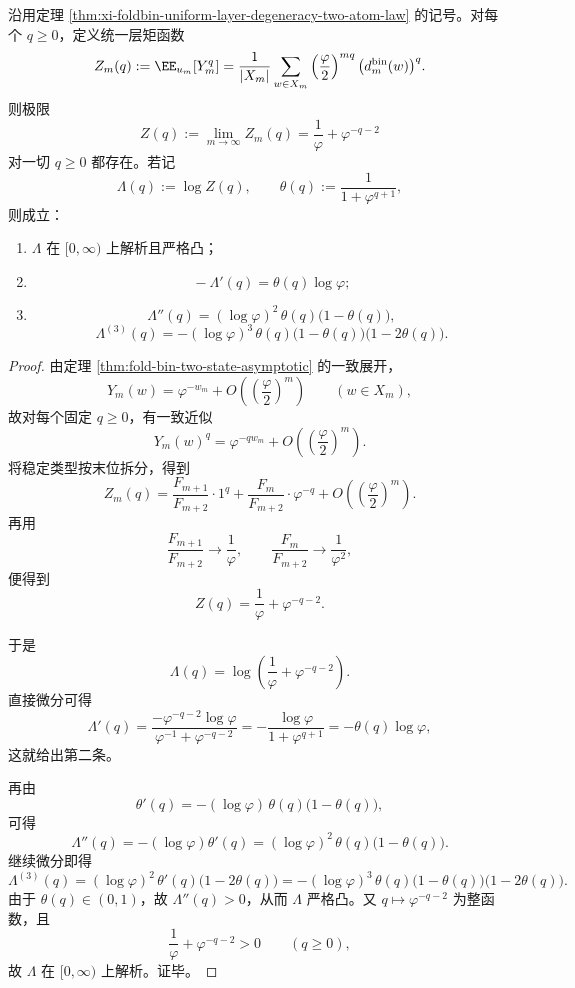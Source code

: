 \begin{theorem}\label{thm:xi-foldbin-uniform-layer-two-point-exponential-family}
沿用定理 \ref{thm:xi-foldbin-uniform-layer-degeneracy-two-atom-law} 的记号。对每个 \(q\ge 0\)，定义统一层矩函数
\[
Z_m(q):=\EE_{u_m}[Y_m^q]
=
\frac{1}{|X_m|}\sum_{w\in X_m}
\left(\frac{\varphi}{2}\right)^{mq}
\bigl(d_m^{\mathrm{bin}}(w)\bigr)^q.
\]
则极限
\[
\boxed{\;
Z(q):=\lim_{m\to\infty}Z_m(q)
=
\frac{1}{\varphi}+\varphi^{-q-2}\;}
\]
对一切 \(q\ge 0\) 都存在。若记
\[
\Lambda(q):=\log Z(q),
\qquad
\theta(q):=\frac{1}{1+\varphi^{q+1}},
\]
则成立：
\begin{enumerate}
  \item \(\Lambda\) 在 \([0,\infty)\) 上解析且严格凸；
  \item
  \[
  \boxed{\;
  -\Lambda'(q)=\theta(q)\log\varphi;\;}
  \]
  \item
  \[
  \boxed{\;
  \Lambda''(q)
  =
  (\log\varphi)^2\,\theta(q)\bigl(1-\theta(q)\bigr),\;}
  \]
  \[
  \boxed{\;
  \Lambda^{(3)}(q)
  =
  -(\log\varphi)^3\,\theta(q)\bigl(1-\theta(q)\bigr)\bigl(1-2\theta(q)\bigr).\;}
  \]
\end{enumerate}
\end{theorem}
\begin{proof}
由定理 \ref{thm:fold-bin-two-state-asymptotic} 的一致展开，
\[
Y_m(w)=\varphi^{-w_m}+O\!\left(\left(\frac{\varphi}{2}\right)^m\right)
\qquad (w\in X_m),
\]
故对每个固定 \(q\ge 0\)，有一致近似
\[
Y_m(w)^q=\varphi^{-q w_m}+O\!\left(\left(\frac{\varphi}{2}\right)^m\right).
\]
将稳定类型按末位拆分，得到
\[
Z_m(q)
=
\frac{F_{m+1}}{F_{m+2}}\cdot 1^q
+
\frac{F_m}{F_{m+2}}\cdot \varphi^{-q}
+
O\!\left(\left(\frac{\varphi}{2}\right)^m\right).
\]
再用
\[
\frac{F_{m+1}}{F_{m+2}}\to \frac{1}{\varphi},
\qquad
\frac{F_m}{F_{m+2}}\to \frac{1}{\varphi^2},
\]
便得到
\[
Z(q)=\frac{1}{\varphi}+\varphi^{-q-2}.
\]

于是
\[
\Lambda(q)=\log\!\left(\frac{1}{\varphi}+\varphi^{-q-2}\right).
\]
直接微分可得
\[
\Lambda'(q)
=
\frac{-\varphi^{-q-2}\log\varphi}{\varphi^{-1}+\varphi^{-q-2}}
=
-\frac{\log\varphi}{1+\varphi^{q+1}}
=
-\theta(q)\log\varphi,
\]
这就给出第二条。

再由
\[
\theta'(q)=-(\log\varphi)\,\theta(q)\bigl(1-\theta(q)\bigr),
\]
可得
\[
\Lambda''(q)=-(\log\varphi)\theta'(q)
=
(\log\varphi)^2\,\theta(q)\bigl(1-\theta(q)\bigr).
\]
继续微分即得
\[
\Lambda^{(3)}(q)
=
(\log\varphi)^2\,\theta'(q)\bigl(1-2\theta(q)\bigr)
=
-(\log\varphi)^3\,\theta(q)\bigl(1-\theta(q)\bigr)\bigl(1-2\theta(q)\bigr).
\]
由于 \(\theta(q)\in(0,1)\)，故 \(\Lambda''(q)>0\)，从而 \(\Lambda\) 严格凸。又 \(q\mapsto \varphi^{-q-2}\) 为整函数，且
\[
\frac{1}{\varphi}+\varphi^{-q-2}>0
\qquad(q\ge 0),
\]
故 \(\Lambda\) 在 \([0,\infty)\) 上解析。证毕。
\end{proof}

